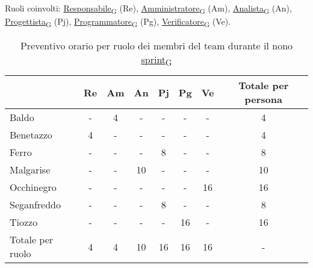 \newpage
{}
Ruoli coinvolti: \href{https://7last.github.io/docs/rtb/documentazione-interna/glossario\#responsabile}{Responsabile\textsubscript{G}} (Re), \href{https://7last.github.io/docs/rtb/documentazione-interna/glossario\#amministratore}{Amministratore\textsubscript{G}} (Am), \href{https://7last.github.io/docs/rtb/documentazione-interna/glossario\#analista}{Analista\textsubscript{G}} (An), \href{https://7last.github.io/docs/rtb/documentazione-interna/glossario\#progettista}{Progettista\textsubscript{G}} (Pj), \href{https://7last.github.io/docs/rtb/documentazione-interna/glossario\#programmatore}{Programmatore\textsubscript{G}} (Pg), \href{https://7last.github.io/docs/rtb/documentazione-interna/glossario\#verificatore}{Verificatore\textsubscript{G}} (Ve).
\begin{table}[!h]
	\centering
	\begin{tabular}{ | l | c | c | c | c | c | c | c | }
		\hline
		\textbf{} & \textbf{Re} & \textbf{Am} &\textbf{An} & \textbf{Pj} & \textbf{Pg} & \textbf{Ve} & \textbf{Totale per persona} \\
		\hline			    %
		Baldo            &  -   &  4   &  -   &  -   &  -   &  -   &  4   \\
		Benetazzo        &  4   &  -   &  -   &  -   &  -   &  -   &  4   \\
		Ferro            &  -   &  -   &  -   &  8   &  -   &  -   &  8   \\
		Malgarise        &  -   &  -   & 10   &  -   &  -   &  -   & 10   \\
		Occhinegro       &  -   &  -   &  -   &  -   &  -   & 16   & 16   \\
		Seganfreddo      &  -   &  -   &  -   &  8   &  -   &  -   &  8   \\
		Tiozzo           &  -   &  -   &  -   &  -   & 16   &  -   & 16   \\
		\hline
		Totale per ruolo &  4   &  4   & 10   & 16   & 16   & 16   &  -   \\
		\hline
	\end{tabular}
	\caption{Preventivo orario per ruolo dei membri del team durante il nono \href{https://7last.github.io/docs/rtb/documentazione-interna/glossario\#sprint}{sprint\textsubscript{G}}}

\end{table}

